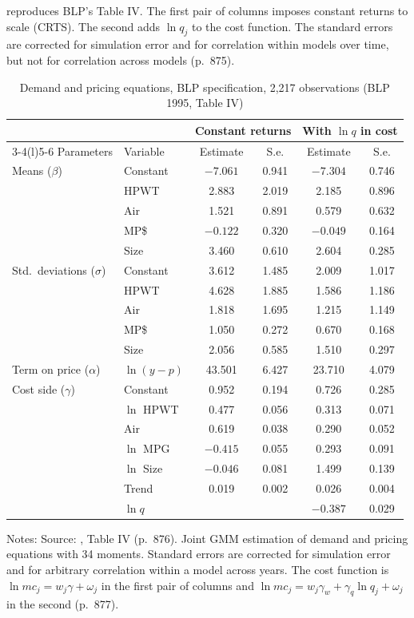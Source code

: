  reproduces BLP's Table IV. The first pair of columns imposes constant returns to
scale (CRTS). The second adds $\ln q_j$ to the cost function. The standard errors are corrected for
simulation error and for correlation within models over time, but not for correlation across models
(p.~875).

\begin{table}[htbp]
\centering
\caption{Demand and pricing equations, BLP specification, 2,217 observations (BLP 1995, Table IV)}
\label{tab:08-blp-full}
\small
\begin{tabular}{@{}llcccc@{}}
\toprule
 & & \multicolumn{2}{c}{Constant returns} & \multicolumn{2}{c}{With $\ln q$ in cost} \\
\cmidrule(lr){3-4}\cmidrule(l){5-6}
Parameters & Variable & Estimate & S.e. & Estimate & S.e. \\
\midrule
Means ($\beta$) & Constant & $-7.061$ & 0.941 & $-7.304$ & 0.746 \\
 & HPWT & 2.883 & 2.019 & 2.185 & 0.896 \\
 & Air & 1.521 & 0.891 & 0.579 & 0.632 \\
 & MP\$ & $-0.122$ & 0.320 & $-0.049$ & 0.164 \\
 & Size & 3.460 & 0.610 & 2.604 & 0.285 \\
\addlinespace
Std.\ deviations ($\sigma$) & Constant & 3.612 & 1.485 & 2.009 & 1.017 \\
 & HPWT & 4.628 & 1.885 & 1.586 & 1.186 \\
 & Air & 1.818 & 1.695 & 1.215 & 1.149 \\
 & MP\$ & 1.050 & 0.272 & 0.670 & 0.168 \\
 & Size & 2.056 & 0.585 & 1.510 & 0.297 \\
\addlinespace
Term on price ($\alpha$) & $\ln(y-p)$ & 43.501 & 6.427 & 23.710 & 4.079 \\
\addlinespace
Cost side ($\gamma$) & Constant & 0.952 & 0.194 & 0.726 & 0.285 \\
 & $\ln$ HPWT & 0.477 & 0.056 & 0.313 & 0.071 \\
 & Air & 0.619 & 0.038 & 0.290 & 0.052 \\
 & $\ln$ MPG & $-0.415$ & 0.055 & 0.293 & 0.091 \\
 & $\ln$ Size & $-0.046$ & 0.081 & 1.499 & 0.139 \\
 & Trend & 0.019 & 0.002 & 0.026 & 0.004 \\
 & $\ln q$ & & & $-0.387$ & 0.029 \\
\bottomrule
\end{tabular}

\smallskip
\begin{minipage}{0.9\linewidth}
\footnotesize
Notes: Source: \citet{BerryLevinsohnPakes1995}, Table IV (p.~876). Joint GMM estimation of
demand and pricing equations with 34 moments. Standard errors are corrected for simulation error and
for arbitrary correlation within a model across years. The cost function is
$\ln mc_j=w_j\gamma+\omega_j$ in the first pair of columns and
$\ln mc_j=w_j\gamma_w+\gamma_q\ln q_j+\omega_j$ in the second (p.~877).
\end{minipage}
\end{table}

